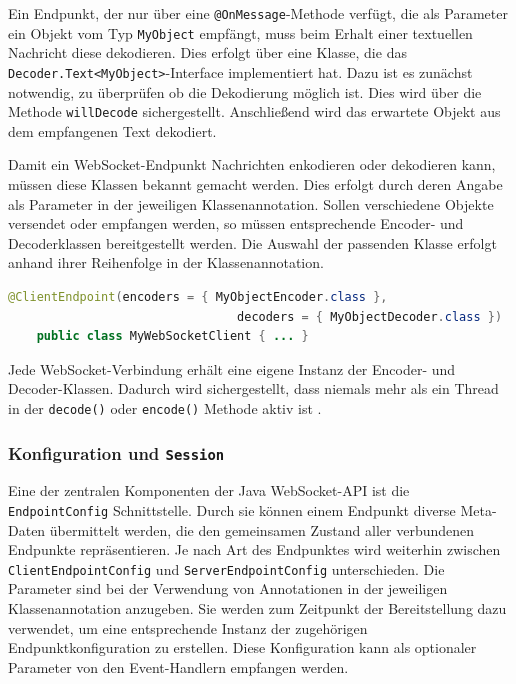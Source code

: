 \documentclass[11pt,a4paper,titlepage]{scrartcl}
\numberwithin{equation}{section}
\begin{document}
\noindent Ein Endpunkt, der nur über eine \texttt{@OnMessage}-Methode verfügt, die als Parameter ein Objekt vom Typ \texttt{MyObject} empfängt, muss beim Erhalt einer textuellen Nachricht diese dekodieren. Dies erfolgt über eine Klasse, die das \texttt{Decoder.Text<MyObject>}-Interface implementiert hat. Dazu ist es zunächst notwendig, zu überprüfen ob die Dekodierung möglich ist. Dies wird über die Methode \texttt{willDecode} sichergestellt. Anschließend wird das erwartete Objekt aus dem empfangenen Text dekodiert.\medskip

\noindent Damit ein WebSocket-Endpunkt Nachrichten enkodieren oder dekodieren kann, müssen diese Klassen bekannt gemacht werden. Dies erfolgt durch deren Angabe als Parameter in der jeweiligen Klassenannotation. Sollen verschiedene Objekte versendet oder empfangen werden, so müssen entsprechende Encoder- und Decoderklassen bereitgestellt werden. Die Auswahl der passenden Klasse erfolgt anhand ihrer Reihenfolge in der Klassenannotation.\medskip

\begin{lstlisting}[frame=single, language=Java, caption=Java: Angabe der Encoder- und Decoder-Klassen]
	@ClientEndpoint(encoders = { MyObjectEncoder.class }, 
								decoders = { MyObjectDecoder.class })
	public class MyWebSocketClient { ... }
\end{lstlisting}

\noindent Jede WebSocket-Verbindung erhält eine eigene Instanz der Encoder- und Decoder-Klassen. Dadurch wird sichergestellt, dass niemals mehr als ein Thread in der \texttt{decode()} oder \texttt{encode()} Methode aktiv ist \autocite[82]{coward_java_2014}. 

\subsubsection{Konfiguration und \texttt{Session}}
Eine der zentralen Komponenten der Java WebSocket-API ist die \texttt{EndpointConfig} Schnittstelle. Durch sie können einem Endpunkt diverse Meta-Daten übermittelt werden, die den gemeinsamen Zustand aller verbundenen Endpunkte repräsentieren. Je nach Art des Endpunktes wird weiterhin zwischen \texttt{ClientEndpointConfig} und \texttt{ServerEndpointConfig} unterschieden. Die Parameter sind bei der Verwendung von Annotationen in der jeweiligen Klassenannotation anzugeben. Sie werden zum Zeitpunkt der Bereitstellung dazu verwendet, um eine entsprechende Instanz der zugehörigen Endpunktkonfiguration zu erstellen. Diese Konfiguration kann als optionaler Parameter von den Event-Handlern empfangen werden.\\
\end{document}
